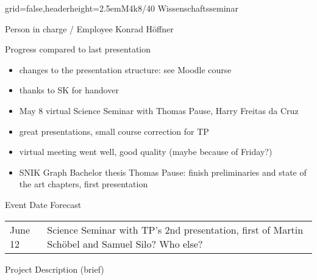 \documentclass[]{kiesgrube}
\begin{document}
\begin{poster}{grid=false,headerheight=2.5em}{}{M4k8/40 Wissenschaftsseminar}{}
\begin{posterbox}[name=person,column=0,row=0]{Person in charge / Employee}
Konrad Höffner
\end{posterbox}
\begin{posterbox}[name=progress,below=person]{Progress compared to last presentation}
\small
\begin{itemize}
\item changes to the presentation structure: see Moodle course
\item thanks to SK for handover
\item May 8 virtual Science Seminar with Thomas Pause, Harry Freitas da Cruz
\item great presentations, small course correction for TP
\item virtual meeting went well, good quality (maybe because of Friday?)
\item SNIK Graph Bachelor thesis Thomas Pause: finish preliminaries and state of the art chapters, first presentation
\end{itemize}
\end{posterbox}
\begin{posterbox}[name=event,below=progress]{Event Date Forecast}
\begin{tabulary}{\textwidth}{lL}
June 12 	&Science Seminar with TP's 2nd presentation, first of Martin Schöbel and Samuel Silo? Who else?\\
\end{tabulary}
\end{posterbox}
\begin{posterbox}[name=description,column=1,row=0]{Project Description (brief)}


\end{posterbox}
\end{poster}
\end{document}
